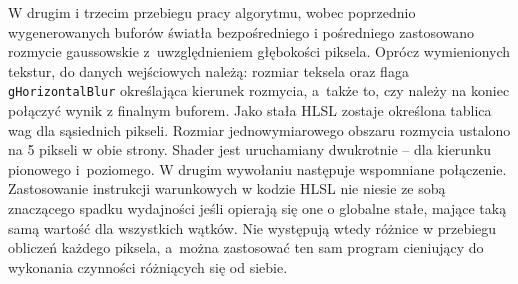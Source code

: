 		W drugim i trzecim przebiegu pracy algorytmu, wobec poprzednio wygenerowanych buforów światła bezpośredniego i pośredniego zastosowano rozmycie gaussowskie z~uwzględnieniem głębokości piksela. Oprócz wymienionych tekstur, do danych wejściowych należą: rozmiar teksela oraz flaga \texttt{gHorizontalBlur} określająca kierunek rozmycia, a~także to, czy należy na koniec połączyć wynik z finalnym buforem. Jako stała HLSL zostaje określona tablica wag dla sąsiednich pikseli. Rozmiar jednowymiarowego obszaru rozmycia ustalono na 5 pikseli w obie strony. Shader jest uruchamiany dwukrotnie -- dla kierunku pionowego i~poziomego. W drugim wywołaniu następuje wspomniane połączenie. 
		Zastosowanie instrukcji warunkowych w kodzie HLSL nie niesie ze sobą znaczącego spadku wydajności jeśli opierają się one o globalne stałe, mające taką samą wartość dla wszystkich wątków. Nie występują wtedy różnice w przebiegu obliczeń każdego piksela, a~można zastosować ten sam program cieniujący do wykonania czynności różniących się od siebie.
		
